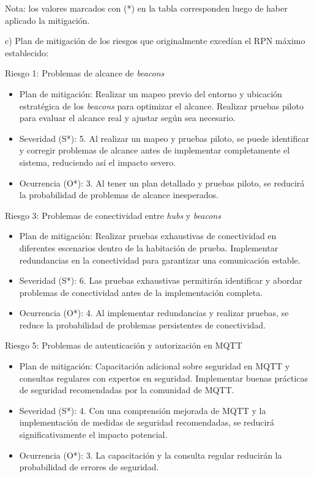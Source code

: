 \documentclass[
11pt, %
]{charter}
\begin{document}
Nota: los valores marcados con (*) en la tabla corresponden luego de haber aplicado la mitigación.

c) Plan de mitigación de los riesgos que originalmente excedían el RPN máximo establecido:

Riesgo 1: Problemas de alcance de \textit{beacons}
\begin{itemize}
	\item Plan de mitigación: Realizar un mapeo previo del entorno y ubicación estratégica de los \textit{beacons} para optimizar el alcance. Realizar pruebas piloto para evaluar el alcance real y ajustar según sea necesario.
	\item Severidad (S*): 5. Al realizar un mapeo y pruebas piloto, se puede identificar y corregir problemas de alcance antes de implementar completamente el sistema, reduciendo así el impacto severo.
	\item Ocurrencia (O*): 3. Al tener un plan detallado y pruebas piloto, se reducirá la probabilidad de problemas de alcance inesperados.
\end{itemize}
 
Riesgo 3: Problemas de conectividad entre \textit{hubs} y \textit{beacons}
\begin{itemize}
	\item Plan de mitigación: Realizar pruebas exhaustivas de conectividad en diferentes escenarios dentro de la habitación de prueba. Implementar redundancias en la conectividad para garantizar una comunicación estable.
	\item Severidad (S*): 6. Las pruebas exhaustivas permitirán identificar y abordar problemas de conectividad antes de la implementación completa.
	\item Ocurrencia (O*): 4. Al implementar redundancias y realizar pruebas, se reduce la probabilidad de problemas persistentes de conectividad.
\end{itemize}

Riesgo 5: Problemas de autenticación y autorización en MQTT
\begin{itemize}
	\item Plan de mitigación: Capacitación adicional sobre seguridad en MQTT y consultas regulares con expertos en seguridad. Implementar buenas prácticas de seguridad recomendadas por la comunidad de MQTT.
	\item Severidad (S*): 4. Con una comprensión mejorada de MQTT y la implementación de medidas de seguridad recomendadas, se reducirá significativamente el impacto potencial.
	\item Ocurrencia (O*): 3. La capacitación y la consulta regular reducirán la probabilidad de errores de seguridad.
\end{itemize}
\end{document}
